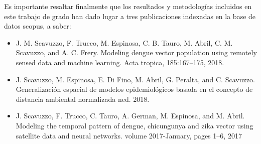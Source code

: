   \par Es importante resaltar finalmente que los resultados y metodologías
    incluidos en este trabajo de grado han dado lugar a tres publicaciones
    indexadas en la base de datos scopus, a saber:

    \begin{itemize}
      \item J. M. Scavuzzo, F. Trucco, M. Espinosa, C. B. Tauro, M. Abril, C. M. Scavuzzo, and
      A. C. Frery. Modeling dengue vector population using remotely sensed data and machine
      learning. Acta tropica, 185:167–175, 2018. \cite{scavuzzo2018modeling}
      \item J. Scavuzzo, M. Espinosa, E. Di Fino, M. Abril, G. Peralta, and C. Scavuzzo.
      Generalización espacial de modelos epidemiológicos basada en el concepto de distancia ambiental
      normalizada ned. 2018. \cite{ned_scavuzzo}
      \item J. Scavuzzo, F. Trucco, C. Tauro, A. German, M. Espinosa, and M. Abril. Modeling
      the temporal pattern of dengue, chicungunya and zika vector using satellite data and
      neural networks. volume 2017-January, pages 1–6, 2017 \cite{scavuzzo_rpic}


    \end{itemize}
%

